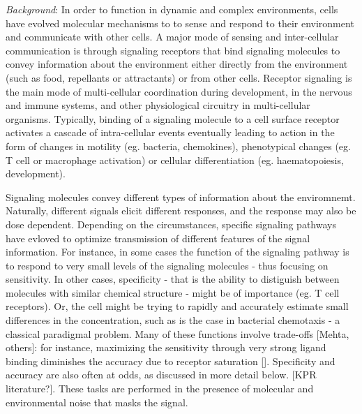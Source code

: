 \documentclass[prl,showpacs]{revtex4}
\begin{document}
\maketitle
\emph{Background}:  In order to function in dynamic and complex environments, cells have evolved molecular mechanisms to to sense and respond to their environment and communicate with other cells.  A major mode of sensing and inter-cellular communication is through signaling receptors that bind signaling molecules to convey information about the environment either directly from the environment (such as food, repellants or attractants) or from other cells. Receptor signaling is the main mode of multi-cellular coordination during development, in the nervous and immune systems, and other physiological circuitry in multi-cellular organisms. Typically, binding of a signaling molecule to a cell surface receptor activates a cascade of intra-cellular events eventually leading to action in the form of changes in motility (eg. bacteria, chemokines), phenotypical changes (eg. T cell or macrophage activation) or cellular  differentiation (eg. haematopoiesis, development).

Signaling molecules convey different types of information about the enviromnemt. Naturally, different signals elicit different responses, and the response may also be dose dependent. Depending on the circumstances, specific signaling pathways have evloved to optimize transmission of different features of the signal information. For instance, in some cases the function of the signaling pathway is to respond to very small levels of the signaling molecules - thus focusing on sensitivity. In other cases, specificity - that is the ability to distiguish between molecules with similar chemical structure - might be of importance (eg. T cell receptors). Or, the cell might be trying to rapidly and accurately estimate small differences in the concentration, such as is the case in bacterial chemotaxis - a classical paradigmal problem. Many of these functions involve trade-offs [Mehta, others]: for instance, maximizing the sensitivity through very strong ligand binding diminishes the accuracy due to receptor saturation []. Specificity and accuracy are also often at odds, as discussed in more detail below.  [KPR literature?]. These tasks are performed in the presence of molecular and environmental noise that masks the signal.
\end{document}
